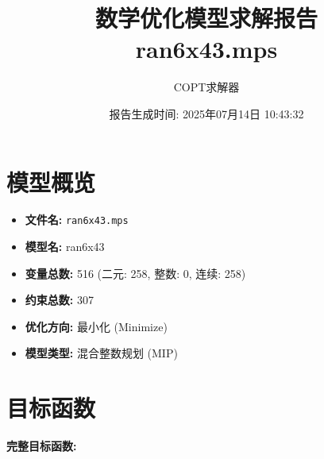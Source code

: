 \documentclass[a4paper,10pt]{article}
\title{数学优化模型求解报告\\{\large ran6x43.mps}}
\author{COPT求解器}
\date{报告生成时间: 2025年07月14日 10:43:32}
\begin{document}
\maketitle
\tableofcontents
\newpage

\section{模型概览}
\begin{itemize}
    \item \textbf{文件名:} \texttt{ran6x43.mps}
    \item \textbf{模型名:} ran6x43
    \item \textbf{变量总数:} 516 (二元: 258, 整数: 0, 连续: 258)
    \item \textbf{约束总数:} 307
    \item \textbf{优化方向:} 最小化 (Minimize)
    \item \textbf{模型类型:} 混合整数规划 (MIP)
\end{itemize}
\section{目标函数}

\textbf{完整目标函数:}
\end{document}
